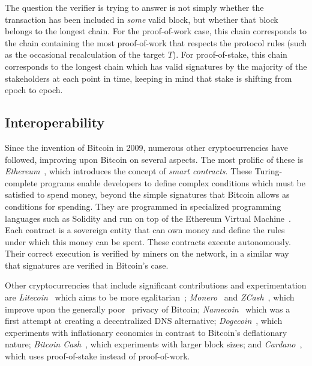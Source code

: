 The question the verifier is trying to answer is not simply whether the
transaction has been included in \emph{some} valid block, but whether that block
belongs to the longest chain. For the proof-of-work case, this chain corresponds
to the chain containing the most proof-of-work that respects the protocol rules
(such as the occasional recalculation of the target $T$). For proof-of-stake,
this chain corresponds to the longest chain which has valid signatures by the
majority of the stakeholders at each point in time, keeping in mind that stake
is shifting from epoch to epoch.


\subsection{Interoperability}
Since the invention of Bitcoin in 2009, numerous other cryptocurrencies have
followed, improving upon Bitcoin on several aspects. The most prolific of these
is \emph{Ethereum}~\cite{buterin}, which introduces the concept of \emph{smart
contracts}. These Turing-complete programs enable developers to define complex
conditions which must be satisfied to spend money, beyond the simple signatures
that Bitcoin allows as conditions for spending. They are programmed in
specialized programming languages such as Solidity and run on top of the
Ethereum Virtual Machine~\cite{wood}. Each contract is a sovereign entity that
can own money and define the rules under which this money can be spent. These
contracts execute autonomously. Their correct execution is verified by miners on
the network, in a similar way that signatures are verified in Bitcoin's case.

Other cryptocurrencies that include significant contributions and
experimentation are \emph{Litecoin}~\cite{litecoin} which aims to be more
egalitarian~\cite{egalitarianism}; \emph{Monero}~\cite{cryptonote} and
\emph{ZCash}~\cite{zerocoin,zcash}, which improve upon the generally
poor~\cite{fistful,quantitative-bitcoin-analysis,tumblebit} privacy of
Bitcoin; \emph{Namecoin}~\cite{namecoin} which was a first attempt at creating a
decentralized DNS alternative; \emph{Dogecoin}~\cite{dogecoin}, which experiments with
inflationary economics in contrast to Bitcoin's deflationary nature;
\emph{Bitcoin Cash}~\cite{btcVSbch}, which experiments with larger block sizes; and
\emph{Cardano}~\cite{ouroboros}, which uses proof-of-stake instead of proof-of-work.

